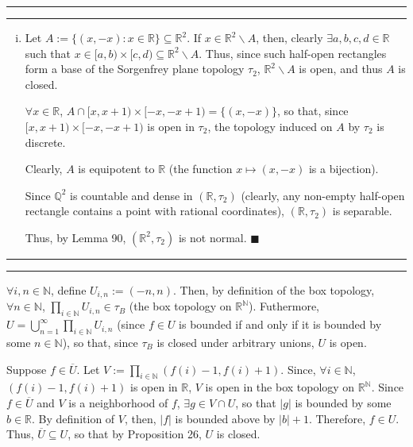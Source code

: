 \documentclass[11pt]{article}
\newcounter{questionCounter}
\newcounter{partCounter}[questionCounter]
\newenvironment{question}[2][\arabic{questionCounter}]{%
    \setcounter{partCounter}{0}%
    \vspace{.25in} \hrule \vspace{0.5em}%
        \noindent{\bf #2}%
    \vspace{0.8em} \hrule \vspace{.10in}%
    \addtocounter{questionCounter}{1}%
}{}
\renewcommand{\qed}{\quad $\blacksquare$}
\newcommand{\sminus}{\backslash}
\newcommand{\N}{\mathbb{N}} %
\newcommand{\Q}{\mathbb{Q}} %
\newcommand{\R}{\mathbb{R}} %
\begin{document}
\begin{question}{Problem 3}
\begin{enumerate}[(i)]
\item Let $A := \{(x,-x) : x \in \R\} \subseteq \R^2$. If
$x \in \R^2 \sminus A$, then, clearly $\exists a,b,c,d \in \R$ such that
$x \in [a,b) \times [c,d) \subseteq \R^2 \sminus A$. Thus, since such
half-open rectangles form a base of the Sorgenfrey plane topology $\tau_2$,
$\R^2 \sminus A$ is open, and thus $A$ is closed.

$\forall x \in \R$,
$A \cap [x,x + 1) \times [-x,-x + 1) = \{(x,-x)\}$, so that, since
$[x,x + 1) \times [-x,-x + 1)$ is open in $\tau_2$, the topology induced on
$A$ by $\tau_2$ is discrete.

Clearly, $A$ is equipotent to $\R$ (the function $x \mapsto (x,-x)$ is a
bijection).

Since $\Q^2$ is countable and dense in $(\R,\tau_2)$ (clearly, any non-empty
half-open rectangle contains a point with rational coordinates), $(\R,\tau_2)$
is separable.

Thus, by Lemma 90, $(\R^2,\tau_2)$ is not normal. \qed

\end{enumerate}
\end{question}

\newpage
\begin{question}{Problem 4}
$\forall i,n \in \N$, define $U_{i,n} := (-n,n)$. Then, by definition of the
box topology, $\forall n \in \N$, $\prod_{i \in \N} U_{i,n} \in \tau_B$ (the
box topology on $\R^{\N}$).
Futhermore, $U = \bigcup_{n = 1}^{\infty} \prod_{i \in \N} U_{i,n}$
(since $f \in U$ is bounded if and only if it is bounded by some $n \in \N$),
so that, since $\tau_B$ is closed under arbitrary unions, $U$ is open.

Suppose $f \in \overline{U}$. Let $V := \prod_{i \in \N} (f(i) - 1,f(i) + 1)$.
Since, $\forall i \in \N$, $(f(i) - 1,f(i) + 1)$ is open in $\R$, $V$ is open
in the box topology on $\R^{\N}$. Since $f \in \overline{U}$ and $V$ is a
neighborhood of $f$, $\exists g \in V \cap U$, so that $|g|$ is bounded by
some $b \in \R$. By definition of $V$, then, $|f|$ is bounded above by
$|b| + 1$. Therefore, $f \in U$. Thus, $\overline{U} \subseteq U$, so that by
Proposition 26, $U$ is closed.
\end{question}
\end{document}

